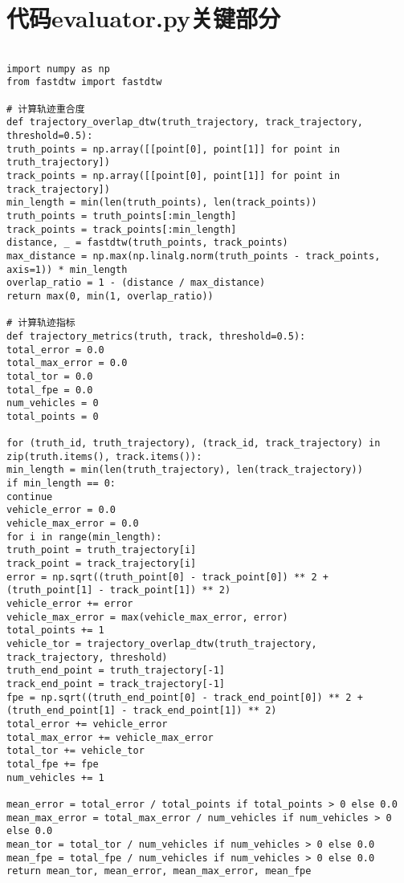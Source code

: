 
\section{代码evaluator.py关键部分}


\begin{lstlisting}

import numpy as np
from fastdtw import fastdtw

# 计算轨迹重合度
def trajectory_overlap_dtw(truth_trajectory, track_trajectory, threshold=0.5):
truth_points = np.array([[point[0], point[1]] for point in truth_trajectory])
track_points = np.array([[point[0], point[1]] for point in track_trajectory])
min_length = min(len(truth_points), len(track_points))
truth_points = truth_points[:min_length]
track_points = track_points[:min_length]
distance, _ = fastdtw(truth_points, track_points)
max_distance = np.max(np.linalg.norm(truth_points - track_points, axis=1)) * min_length
overlap_ratio = 1 - (distance / max_distance)
return max(0, min(1, overlap_ratio))

# 计算轨迹指标
def trajectory_metrics(truth, track, threshold=0.5):
total_error = 0.0
total_max_error = 0.0
total_tor = 0.0
total_fpe = 0.0
num_vehicles = 0
total_points = 0

for (truth_id, truth_trajectory), (track_id, track_trajectory) in zip(truth.items(), track.items()):
min_length = min(len(truth_trajectory), len(track_trajectory))
if min_length == 0:
continue
vehicle_error = 0.0
vehicle_max_error = 0.0
for i in range(min_length):
truth_point = truth_trajectory[i]
track_point = track_trajectory[i]
error = np.sqrt((truth_point[0] - track_point[0]) ** 2 + (truth_point[1] - track_point[1]) ** 2)
vehicle_error += error
vehicle_max_error = max(vehicle_max_error, error)
total_points += 1
vehicle_tor = trajectory_overlap_dtw(truth_trajectory, track_trajectory, threshold)
truth_end_point = truth_trajectory[-1]
track_end_point = track_trajectory[-1]
fpe = np.sqrt((truth_end_point[0] - track_end_point[0]) ** 2 + (truth_end_point[1] - track_end_point[1]) ** 2)
total_error += vehicle_error
total_max_error += vehicle_max_error
total_tor += vehicle_tor
total_fpe += fpe
num_vehicles += 1

mean_error = total_error / total_points if total_points > 0 else 0.0
mean_max_error = total_max_error / num_vehicles if num_vehicles > 0 else 0.0
mean_tor = total_tor / num_vehicles if num_vehicles > 0 else 0.0
mean_fpe = total_fpe / num_vehicles if num_vehicles > 0 else 0.0
return mean_tor, mean_error, mean_max_error, mean_fpe


\end{lstlisting}
